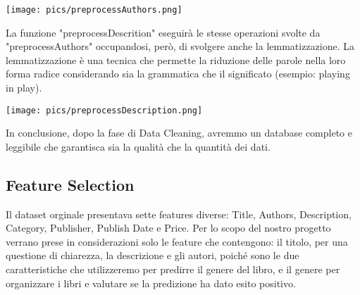 \documentclass[12pt,oneside]{article}
\begin{document}
\begin{enumerate}
\begin{justify}
    \end{justify}
    \texttt{[image: pics/preprocessAuthors.png]}
    \newpage
    \begin{justify}
    La funzione "preprocessDescrition" eseguirà le stesse operazioni svolte da "preprocessAuthors" occupandosi, però, di svolgere anche la lemmatizzazione. La lemmatizzazione è una tecnica che permette la riduzione delle parole nella loro forma radice considerando sia la grammatica che il significato (esempio: playing in play). 
    \end{justify}
    \texttt{[image: pics/preprocessDescription.png]}
    \begin{justify}
    In conclusione, dopo la fase di Data Cleaning, avremmo un database completo e leggibile che garantisca sia la qualità che la quantità dei dati. 
    \end{justify}
    \end{enumerate}
    

    \begin{enumerate}
    \subsection{Feature Selection}
    \begin{justify}
    Il dataset orginale presentava sette features diverse: Title, Authors, Description, Category, Publisher, Publish Date e Price. Per lo scopo del nostro progetto verrano prese in considerazioni solo le feature che contengono: il titolo, per una questione di chiarezza, la descrizione e gli autori, poiché sono le due caratteristiche che utilizzeremo per predirre il genere del libro, e il genere per organizzare i libri e valutare se la predizione ha dato esito positivo.
    \end{justify}
    \end{enumerate}
\end{document}
